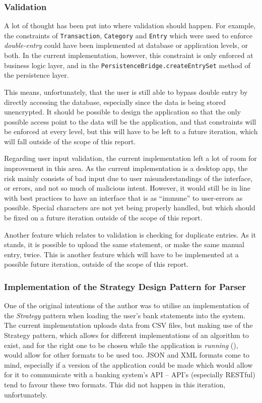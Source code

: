 \subsubsection{Validation} \label{sec:Reflections.TimeConstraints.Validation} 
A lot of thought has been put into where validation should happen. For example,
the constraints of \texttt{Transaction}, \texttt{Category} and \texttt{Entry}
which were used to enforce \emph{double-entry} could have been implemented at
database or application levels, or both. In the current implementation,
however, this constraint is only enforced at business logic layer, and in the
\texttt{PersistenceBridge.createEntrySet} method of the persistence layer.

This means, unfortunately, that the user is still able to bypass double entry by
directly accessing the database, especially since the data is being stored
unencrypted. It should be possible to design the application so that the only
possible access point to the data will be the application, and that constraints
will be enforced at every level, but this will have to be left to a future
iteration, which will fall outside of the scope of this report.

Regarding user input validation, the current implementation left a lot of room
for improvement in this area. As the current implementation is a desktop app,
the risk mainly consists of bad input due to user misunderstandings of the
interface, or errors, and not so much of malicious intent. However, it would
still be in line with best practices to have an interface that is as ``immune''
to user-errors as possible. Special characters are not yet being properly
handled, but which should be fixed on a future iteration outside of the scope
of this report.

Another feature which relates to validation is checking for duplicate entries.
As it stands, it is possible to upload the same statement, or make the same
manual entry, twice. This is another feature which will have to be implemented
at a possible future iteration, outside of the scope of this report.


\subsubsection{Implementation of the Strategy Design Pattern for Parser}
One of the original intentions of the author was to utilise an implementation
of the \emph{Strategy} pattern when loading the user's bank statements into the
system. The current implementation uploads data from CSV files, but making use
of the Strategy pattern, which allows for different implementations of an
algorithm to exist, and for the right one to be chosen while the application is
\emph{running} (\cite[][Ch.~8,~Location~3152]{nikolov2016scala}), would allow
for other formats to be used too. JSON and XML formats come to mind, especially
if a version of the application could be made which would allow for it to
communicate with a banking system's API -- API's (especially RESTful) tend to
favour these two formats. This did not happen in this iteration, unfortunately.

